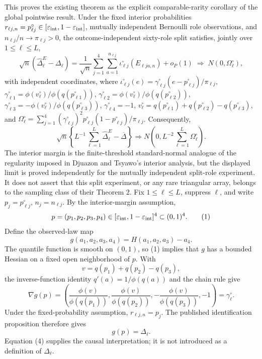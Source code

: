 This proves the existing theorem as the explicit comparable-rarity corollary of the global pointwise result.
Under the fixed interior probabilities \(r_{\ell j,n}=p^{\circ}_{\ell j}\in[\varepsilon_{\rm int},1-\varepsilon_{\rm int}]\), mutually independent Bernoulli role observations, and \(n_{\ell j}/n\to\pi_{\ell j}>0\), the outcome-independent sixty-role split satisfies, jointly over \(1\le\ell\le L\),
\[
\sqrt n(\widehat\Delta^E_{\ell}-\Delta_{\ell})
=\frac1{\sqrt n}\sum_{j=1}^{4}\sum_{a=1}^{n_{\ell j}}
\iota^{\circ}_{\ell j}(E_{\ell j a,n})+o_{P}(1)
\;\Rightarrow\;N(0,\Omega^{\circ}_{\ell}),
\]
with independent coordinates, where \(\iota^{\circ}_{\ell j}(e)=\gamma^{\circ}_{\ell j}(e-p^{\circ}_{\ell j})/\pi_{\ell j}\), \(\gamma^{\circ}_{\ell1}=\phi(v^{\circ}_{\ell})/\phi(q(p^{\circ}_{\ell1}))\), \(\gamma^{\circ}_{\ell2}=\phi(v^{\circ}_{\ell})/\phi(q(p^{\circ}_{\ell2}))\), \(\gamma^{\circ}_{\ell3}=-\phi(v^{\circ}_{\ell})/\phi(q(p^{\circ}_{\ell3}))\), \(\gamma^{\circ}_{\ell4}=-1\), \(v^{\circ}_{\ell}=q(p^{\circ}_{\ell1})+q(p^{\circ}_{\ell2})-q(p^{\circ}_{\ell3})\), and \(\Omega^{\circ}_{\ell}=\sum_{j=1}^{4}(\gamma^{\circ}_{\ell j})^2p^{\circ}_{\ell j}(1-p^{\circ}_{\ell j})/\pi_{\ell j}\). Consequently,
\[
\sqrt n\left\{L^{-1}\sum_{\ell=1}^{L}\widehat\Delta^E_{\ell}-\overline\Delta\right\}
\Rightarrow N\!\left(0,L^{-2}\sum_{\ell=1}^{L}\Omega^{\circ}_{\ell}\right).
\]
The interior margin is the finite-threshold standard-normal analogue of the regularity imposed in Djuazon and Tsyawo's interior analysis, but the displayed limit is proved independently for the mutually independent split-role experiment. It does not assert that this split experiment, or any rare triangular array, belongs to the sampling class of their Theorem 2.
Fix \(1\le\ell\le L\), suppress \(\ell\), and write \(p_j=p^{\circ}_{\ell j}\), \(n_j=n_{\ell j}\).  By the interior-margin assumption,
\[
p=(p_1,p_2,p_3,p_4)\in
[\varepsilon_{\rm int},1-\varepsilon_{\rm int}]^4\subset(0,1)^4.
\tag{1}
\]
Define the observed-law map
\[
g(a_1,a_2,a_3,a_4)=H(a_1,a_2,a_3)-a_4.
\tag{2}
\]
The quantile function is smooth on \((0,1)\), so (1) implies that \(g\) has a bounded Hessian on a fixed open neighborhood of \(p\).  With
\[
v=q(p_1)+q(p_2)-q(p_3),
\]
the inverse-function identity \(q'(a)=1/\phi(q(a))\) and the chain rule give
\[
\nabla g(p)=
\left(
\frac{\phi(v)}{\phi(q(p_1))},
\frac{\phi(v)}{\phi(q(p_2))},
-\frac{\phi(v)}{\phi(q(p_3))},
-1
\right)
=\gamma^\circ_\ell.
\tag{3}
\]
Under the fixed-probability assumption, \(r_{\ell j,n}=p_j\).  The published identification proposition therefore gives
\[
g(p)=\Delta_\ell.
\tag{4}
\]
Equation (4) supplies the causal interpretation; it is not introduced as a definition of \(\Delta_\ell\).

